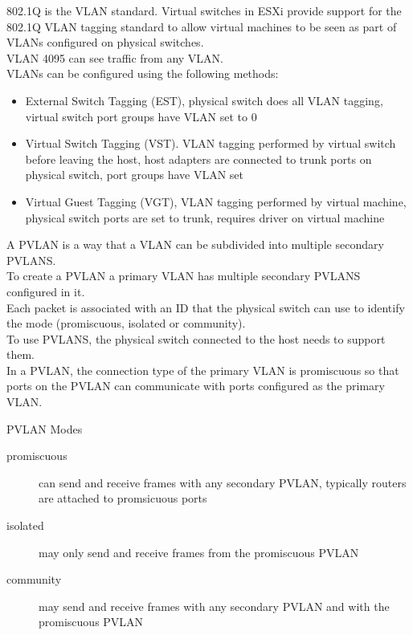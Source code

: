 802.1Q is the VLAN standard. Virtual switches in ESXi provide support for the
802.1Q VLAN tagging standard to allow virtual machines to be seen as part of
VLANs configured on physical switches.\\

VLAN 4095 can see traffic from any VLAN.\\

VLANs can be configured using the following methods:

\begin{itemize}

\item External Switch Tagging (EST), physical switch does all VLAN tagging,
virtual switch port groups have VLAN set to 0

\item Virtual Switch Tagging (VST). VLAN tagging performed by virtual switch
before leaving the host, host adapters are connected to trunk ports on
physical switch, port groups have VLAN set

\item Virtual Guest Tagging (VGT), VLAN tagging performed by virtual machine,
physical switch ports are set to trunk, requires driver on virtual machine

\end{itemize}

A PVLAN is a way that a VLAN can be subdivided into multiple secondary PVLANS.\\

To create a PVLAN a primary VLAN has multiple secondary PVLANS configured in
it.\\

Each packet is associated with an ID that the physical switch can use to
identify the mode (promiscuous, isolated or community).\\

To use PVLANS, the physical switch connected to the host needs to support them.\\

In a PVLAN, the connection type of the primary VLAN is promiscuous so that
ports on the PVLAN can communicate with ports configured as the primary VLAN.

PVLAN Modes

\begin{description}

\item[promiscuous]
can send and receive frames with any secondary PVLAN, typically routers are
attached to promsicuous ports

\item[isolated]
may only send and receive frames from the promiscuous PVLAN

\item[community]
may send and receive frames with any secondary PVLAN and with the promiscuous
PVLAN

\end{description}

